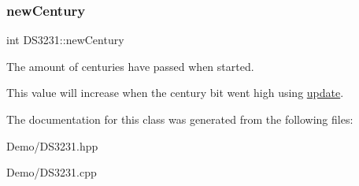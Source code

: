 \subsubsection{\texorpdfstring{new\+Century}{newCentury}}
{\footnotesize\ttfamily int D\+S3231\+::new\+Century\hspace{0.3cm}{\ttfamily [private]}}



The amount of centuries have passed when started. 

This value will increase when the century bit went high using \mbox{\hyperlink{class_d_s3231_a143ec57122d892ea0ec671a153352f2c}{update}}. 

The documentation for this class was generated from the following files\+:\begin{DoxyCompactItemize}
\item 
Demo/D\+S3231.\+hpp\item 
Demo/D\+S3231.\+cpp\end{DoxyCompactItemize}
